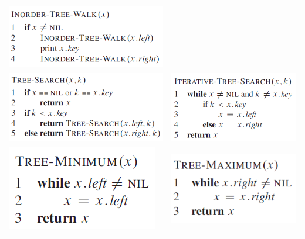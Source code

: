 \documentclass[11pt,a4paper]{article}
\begin{document}
\begin{tabular}{l l}
\includegraphics[scale=0.4]{img/tree1.png} \\
\includegraphics[scale=0.4]{img/tree2.png} & \includegraphics[scale=0.4]{img/tree3.png}\\
\includegraphics[scale=0.4]{img/tree4.png} & \includegraphics[scale=0.4]{img/tree5.png}\\

\end{tabular}
\end{document}
